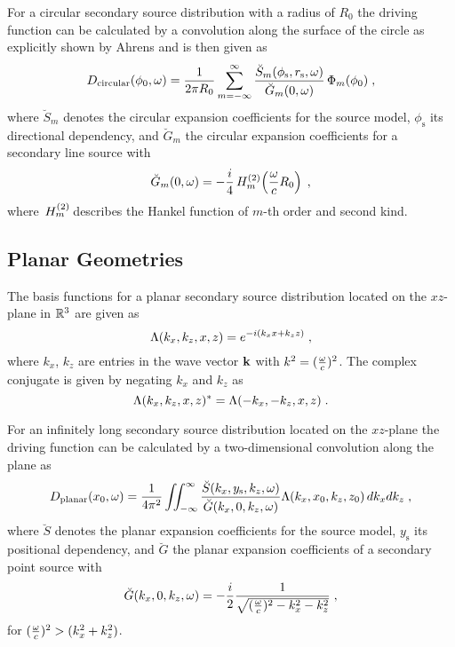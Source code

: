 For a circular secondary source distribution with a radius of $R_0$ the
driving function can
be calculated by a convolution along the surface of the circle as explicitly
shown by Ahrens\autocite{Ahrens2009c} and is then given as
%
\begin{equation}
    D_\text{circular}(\phi_0,\omega) = \frac{1}{2\pi R_0} \sum_{m=-\infty}^\infty 
    \frac{\breve{S}_m(\phi_\text{s},r_\text{s},\omega)}{\breve{G}_m(0,\omega)} \,
    \Phi_m(\phi_0) \qc
    \label{eq:D_circular}
\end{equation}
%
where $\breve{S}_m$ denotes the circular expansion coefficients for
the source model, $\phi_\text{s}$ its directional dependency, and $\breve{G}_m$
the circular expansion coefficients for a secondary line source with
%
\begin{equation}
    \breve{G}_m(0,\omega) = -\frac{i}{4} \H{m}{2}\left(\omegac R_0\right) \qc
    \label{eq:G_circular}
\end{equation}
%
where $\,H_{m}^{(2)}\!$ describes the Hankel function of $m$-th order and second kind.


\subsection{Planar Geometries}
\label{sec:planar_geometries}

The basis functions for a planar secondary source distribution
located on the $xz$-plane in $\mathbb{R}^3$ are given as
%
\begin{equation}
    \Lambda(k_x,k_z,x,z) = e^{-i(k_x x + k_z z)} \qc
    \label{eq:planar_harmonics}
\end{equation}
%
where $k_x$, $k_z$ are entries in the wave vector $\mathbf{k}$ with $k^2 =
(\frac{\omega}{c})^2$.
The complex conjugate is given by negating $k_x$ and $k_z$ as
%
\begin{equation}
    \Lambda(k_x,k_z,x,z)^* = \Lambda(-k_x,-k_z,x,z) \;.
\end{equation}
%

For an infinitely long secondary source distribution located on the
$xz$-plane the driving function can be calculated by a two-dimensional
convolution along the plane as\autocite[][(3.65)]{Ahrens2012}
%
\begin{equation}
    D_\text{planar}(x_0,\omega) = \frac{1}{4\pi^2} \iint_{-\infty}^\infty
    \frac{\breve{S}(k_x,y_\text{s},k_z,\omega)}{\breve{G}(k_x,0,k_z,\omega)}
    \Lambda(k_x,x_0,k_z,z_0) \, dk_x dk_z \qc
    \label{eq:D_planar}
\end{equation}
%
where $\breve{S}$ denotes the planar expansion coefficients for the
source model, $y_\text{s}$ its positional dependency, and $\breve{G}$ the planar
expansion coefficients of a secondary point source with\autocite[][(65)]{Schultz2014}
%
\begin{equation}
    \breve{G}(k_x,0,k_z,\omega) = -\frac{i}{2}
    \frac{1}{\sqrt{(\omegac)^2-k_x^2-k_z^2}}
    \qc
    \label{G_planar}
\end{equation}
%
for $(\frac{\omega}{c})^2 > (k_x^2+k_z^2)$.

